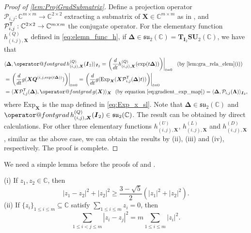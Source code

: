 \documentclass[final,onefignum,onetabnum]{siamart190516}
\makeatletter
\newcommand{\matr}[1]{\boldsymbol{#1}}
\newcommand{\T}{{\sf T}} %
\newcommand{\ProjGrad}[2]{\mathop{{\operator@font grad} }#1(#2)}
\newcommand{\CC}{\mathbb{C}}
\newcommand{\Gmat}[3]{\matr{Q}^{(#1,#2,#3)}}
\newcommand{\Tang}[2]{\mathbf{T}_{#1}{#2}}
\newcommand{\hij}[3]{h^{(Q)}_{(#1,#2), #3}}
\newcommand{\SUNN}[1]{\mathbf{SU}_{#1}}
\newcommand{\su}{\mathfrak{su}}
\makeatother
\begin{document}
\begin{proof}[Proof of \cref{lem:ProjGradSubmatrix}]
Define a projection operator $\mathcal{P}_{i,j}: \CC^{m\times m} \to\CC^{2\times 2}$ extracting a submatrix of $\matr{X} \in \CC^{m\times m}$ as in \cite[Eq. (3.7)]{ULC2019}, and $\mathcal{P}_{i,j}^{\T}: \CC^{2\times 2} \to\CC^{m\times m}$ the conjugate operator.  
For the elementary function $\hij{i}{j}{\matr{X}}$ defined in \cref{eq:elemn_func_h}, if $\matr{\Delta} \in \su_2(\CC) = \Tang{\matr{I}_2}{\SUNN{2}(\CC)}$, we have that 
\begin{align*}
&\langle\matr{\Delta},\ProjGrad{\hij{i}{j}{\matr{X}}}{\matr{I}_2}\rangle_{\matr{I}_2}  =
\left.\left( \frac{d}{dt} \hij{i}{j}{\matr{X}} (\exp(t\matr{\Delta}) )\right)\right|_{t=0} \ \ (\text{by \Cref{lem:gra_rela_elem}(i)}) \\
&= 
\left.\left( \frac{d}{dt} g (\matr{X} \Gmat{i}{j}{\exp(t\matr{\Delta} )} )\right)\right|_{t=0}
= \left.\left( \frac{d}{dt} g (\text{Exp}_{\matr{X}} (\matr{X}\mathcal{P}_{i,j}^{\T}(\matr{\Delta} )t )) \right)\right|_{t=0} \\
&= \langle\matr{X} \mathcal{P}_{i,j}^{\T}(\matr{\Delta}),\ProjGrad{g}{\matr{X}}\rangle_{\matr{X}} \ \ (\text{by equation}\   \cref{eq:gradient_exp_map})=
\langle\matr{\Delta},\mathcal{P}_{i,j} (\matr{\Lambda})\rangle_{\matr{I}_2},
\end{align*}
where $\text{Exp}_{\matr{X}}$ is the map defined in \cref{eq:Exp_x_sl}. 
Note that $\matr{\Delta} \in \su_2(\CC)$ and $\ProjGrad{\hij{i}{j}{\matr{X}}}{\matr{I}_2} \in \su_2(\CC)$. 
The result can be obtained by direct calculations. 
For other three elementary functions  $h^{(U)}_{(i,j),\matr{X}}$, $h^{(L)}_{(i,j),\matr{X}}$ and $h^{(D)}_{(i,j),\matr{X}}$, similar as the above case, we can obtain the results by  (ii), (iii) and (iv), respectively. 
The proof is complete.
\end{proof}

We need a simple lemma before the proofs of  and .

\begin{lemma}\label{lemma-ai-sum-0_c}
(i) If $z_1,z_2\in\CC$, 
then 
\begin{equation*}
|z_1-z_2|^2 + |z_2|^2 \geq \frac{3-\sqrt{5}}{2}(|z_1|^2+|z_2|^2).
\end{equation*}
(ii) If $\{z_i\}_{1\leq i\leq m}\subseteq\CC$ satisfy $\sum_{1\leq i\leq m}z_i=0$, 
then 
\begin{equation*}
\sum_{1\leq i<j\leq m}|z_i-z_j|^2 = m\sum_{1\leq i\leq m}|z_i|^2.
\end{equation*}
\end{lemma}
\end{document}
